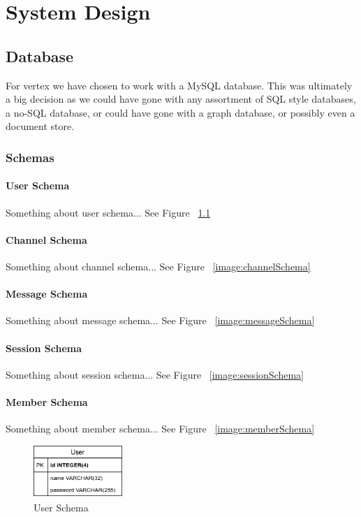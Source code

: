 \chapter{System Design}
\section{Database}
For vertex we have chosen to work with a MySQL database. This was ultimately a big decision as we could have gone with any assortment of SQL style databases, a no-SQL database, or could have gone with a graph database, or possibly even a document store.

\subsection{Schemas}
\subsubsection{User Schema}
Something about user schema...
See Figure ~\ref{image:userSchema}

\subsubsection{Channel Schema}
Something about channel schema...
See Figure ~\ref{image:channelSchema}

\subsubsection{Message Schema}
Something about message schema...
See Figure ~\ref{image:messageSchema}

\subsubsection{Session Schema}
Something about session schema...
See Figure ~\ref{image:sessionSchema}

\subsubsection{Member Schema}
Something about member schema...
See Figure ~\ref{image:memberSchema}

\begin{figure}[h!]
    \caption{User Schema}
    \label{image:userSchema}
    \centering
    \includegraphics[width=0.3\textwidth]{images/UserSchema.png}
\end{figure}

